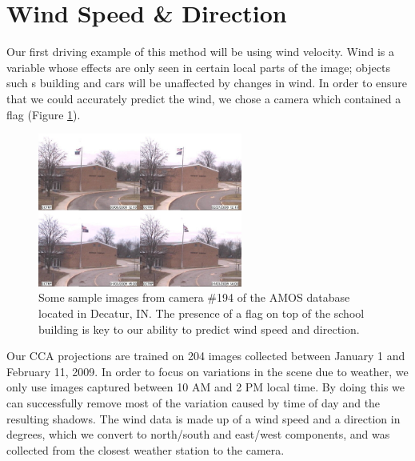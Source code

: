 \section{Wind Speed \& Direction}
Our first driving example of this method will be using wind velocity. Wind is a variable whose effects are only seen in certain local parts of the image; objects such s building and cars will be unaffected by changes in wind. In order to ensure that we could accurately predict the wind, we chose a camera which contained a flag (Figure \ref{fig:windspeedextremes}). 
\begin{figure}
	\centering
		\includegraphics[width=0.60\textwidth]{figures/windspeedextremes.jpg}
	\caption{Some sample images from camera $\#$194 of the AMOS database located in Decatur, IN. The presence of a flag on top of the school building is key to our ability to predict wind speed and direction.}
	\label{fig:windspeedextremes}
\end{figure}
Our CCA projections are trained on 204 images collected between January 1 and February 11, 2009. In order to focus on variations in the scene due to weather, we only use images captured between 10 AM and 2 PM local time. By doing this we can successfully remove most of the variation caused by time of day and the resulting shadows. The wind data is made up of a wind speed and a direction in degrees, which we convert to north/south and east/west components, and was collected from the closest weather station to the camera. 

